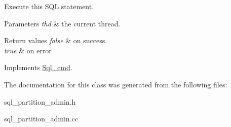 Execute this S\+QL statement. 
\begin{DoxyParams}{Parameters}
{\em thd} & the current thread. \\
\hline
\end{DoxyParams}

\begin{DoxyRetVals}{Return values}
{\em false} & on success. \\
\hline
{\em true} & on error \\
\hline
\end{DoxyRetVals}


Implements \mbox{\hyperlink{classSql__cmd_a213367b79b551296fbb7790f2a3732fb}{Sql\+\_\+cmd}}.



The documentation for this class was generated from the following files\+:\begin{DoxyCompactItemize}
\item 
sql\+\_\+partition\+\_\+admin.\+h\item 
sql\+\_\+partition\+\_\+admin.\+cc\end{DoxyCompactItemize}
